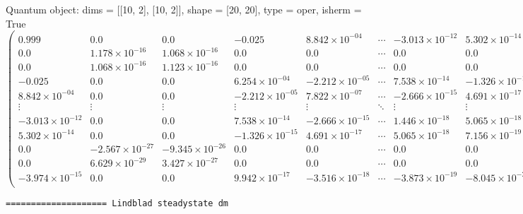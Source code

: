 \documentclass{article}
\begin{document}
    Quantum object: dims = [[10, 2], [10, 2]], shape = [20, 20], type = oper, isherm = True\begin{equation*}\begin{pmatrix}0.999 & 0.0 & 0.0 & -0.025 & 8.842\times10^{-04} & \cdots & -3.013\times10^{-12} & 5.302\times10^{-14} & 0.0 & 0.0 & -3.974\times10^{-15}\\0.0 & 1.178\times10^{-16} & 1.068\times10^{-16} & 0.0 & 0.0 & \cdots & 0.0 & 0.0 & -2.567\times10^{-27} & 6.629\times10^{-29} & 0.0\\0.0 & 1.068\times10^{-16} & 1.123\times10^{-16} & 0.0 & 0.0 & \cdots & 0.0 & 0.0 & -9.345\times10^{-26} & 3.427\times10^{-27} & 0.0\\-0.025 & 0.0 & 0.0 & 6.254\times10^{-04} & -2.212\times10^{-05} & \cdots & 7.538\times10^{-14} & -1.326\times10^{-15} & 0.0 & 0.0 & 9.942\times10^{-17}\\8.842\times10^{-04} & 0.0 & 0.0 & -2.212\times10^{-05} & 7.822\times10^{-07} & \cdots & -2.666\times10^{-15} & 4.691\times10^{-17} & 0.0 & 0.0 & -3.516\times10^{-18}\\\vdots & \vdots & \vdots & \vdots & \vdots & \ddots & \vdots & \vdots & \vdots & \vdots & \vdots\\-3.013\times10^{-12} & 0.0 & 0.0 & 7.538\times10^{-14} & -2.666\times10^{-15} & \cdots & 1.446\times10^{-18} & 5.065\times10^{-18} & 0.0 & 0.0 & -3.873\times10^{-19}\\5.302\times10^{-14} & 0.0 & 0.0 & -1.326\times10^{-15} & 4.691\times10^{-17} & \cdots & 5.065\times10^{-18} & 7.156\times10^{-19} & 0.0 & 0.0 & -8.045\times10^{-20}\\0.0 & -2.567\times10^{-27} & -9.345\times10^{-26} & 0.0 & 0.0 & \cdots & 0.0 & 0.0 & 1.109\times10^{-18} & 4.541\times10^{-18} & 0.0\\0.0 & 6.629\times10^{-29} & 3.427\times10^{-27} & 0.0 & 0.0 & \cdots & 0.0 & 0.0 & 4.541\times10^{-18} & 8.001\times10^{-19} & 0.0\\-3.974\times10^{-15} & 0.0 & 0.0 & 9.942\times10^{-17} & -3.516\times10^{-18} & \cdots & -3.873\times10^{-19} & -8.045\times10^{-20} & 0.0 & 0.0 & 8.080\times10^{-21}\\\end{pmatrix}\end{equation*}

    
    \begin{Verbatim}[commandchars=\\\{\}]
==================== Lindblad steadystate dm
    \end{Verbatim}
\end{document}

